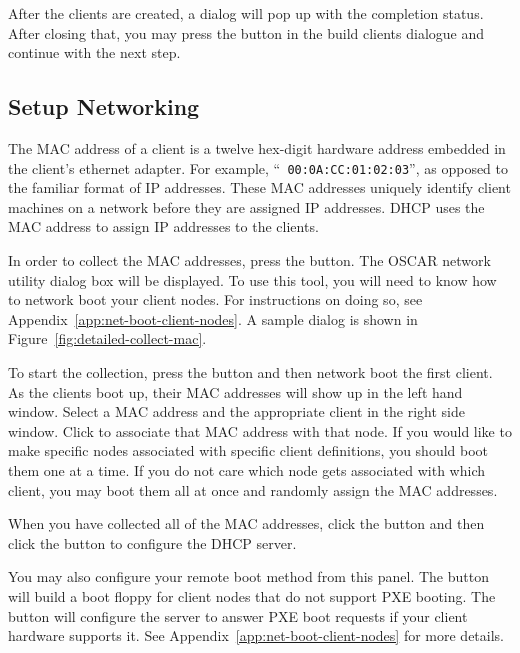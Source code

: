 After the clients are created, a dialog will pop up with the
completion status. After closing that, you may press the
 button in the build clients dialogue and continue with
the next step.


\subsection{Setup Networking}
\label{det:setup-networking}

The MAC address of a client is a twelve hex-digit hardware address
embedded in the client's ethernet adapter. For example, ``{\tt
  00:0A:CC:01:02:03}'', as opposed to the familiar format of IP
addresses.  These MAC addresses uniquely identify client machines on a
network before they are assigned IP addresses. DHCP uses the MAC
address to assign IP addresses to the clients.

In order to collect the MAC addresses, press the  button. The OSCAR network utility dialog box will be
displayed.  To use this tool, you will need to know how to network
boot your client nodes.  For instructions on doing so, see
Appendix~\ref{app:net-boot-client-nodes}. A sample dialog is shown in
Figure~\ref{fig:detailed-collect-mac}.

To start the collection, press the  button
and then network boot the first client.  As the clients boot up, their
MAC addresses will show up in the left hand window. Select a MAC
address and the appropriate client in the right side window. Click
 to associate that MAC address with that
node. If you would like to make specific nodes associated with
specific client definitions, you should boot them one at a time. If
you do not care which node gets associated with which client, you may
boot them all at once and randomly assign the MAC addresses.

When you have collected all of the MAC addresses, click the
 button and then click the  button to configure the DHCP server.
 
You may also configure your remote boot method from this panel. The
 button will build a boot floppy for
client nodes that do not support PXE booting. The  button will configure the server to answer PXE boot
requests if your client hardware supports it. See
Appendix~\ref{app:net-boot-client-nodes} for more details.  


